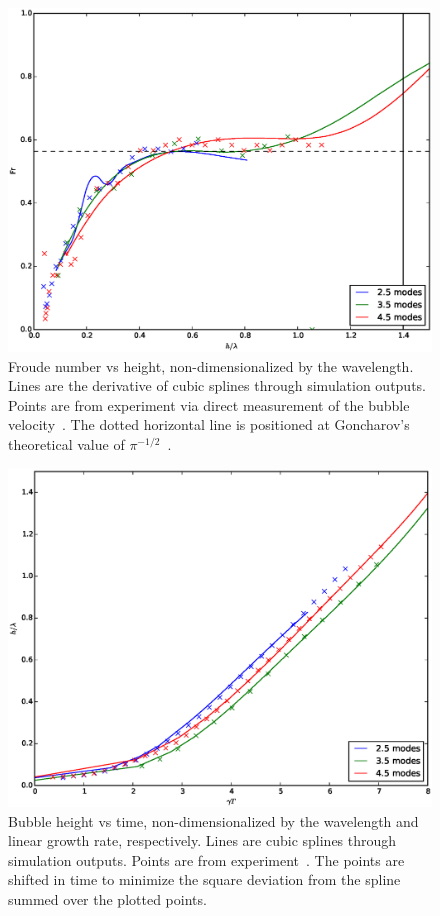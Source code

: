 \begin{figure}
\includegraphics[width=\textwidth]{plts/Fr}
\caption{  
Froude number vs height, non-dimensionalized by the wavelength.
Lines are the derivative of cubic splines through simulation outputs.
Points are from experiment via direct measurement of the bubble velocity~\cite{JacobsPrivate}.
The dotted horizontal line is positioned at Goncharov's theoretical value of $\pi^{-1/2}$~\cite{Goncharov2002}.
}
\end{figure}

\begin{figure}
\includegraphics[width=\textwidth]{plts/aspect}
\caption{  
Bubble height vs time, non-dimensionalized by the wavelength and linear growth rate, respectively.
Lines are cubic splines through simulation outputs.
Points are from experiment~\cite{JacobsPrivate}.
The points are shifted in time to minimize the square deviation from the spline summed over the plotted points.
}
\end{figure}

